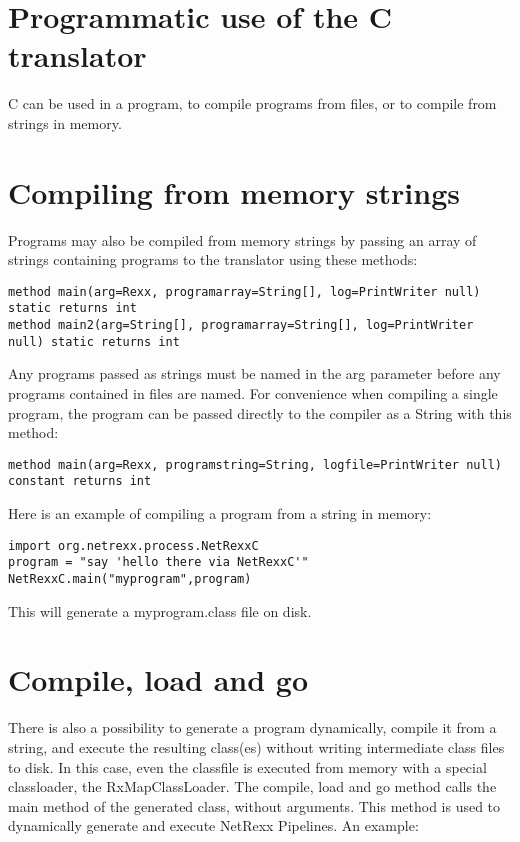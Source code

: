 
\section{Programmatic use of the \nr{}C translator}
\nr{}C can be used in a program, to compile \nr{} programs from files,
or to compile from strings in memory. 

\section{Compiling from memory strings}
Programs may also be compiled from memory strings by passing an array
of strings containing programs to the translator using these methods:

\begin{lstlisting}[label=frommemory,caption=From Memory]
method main(arg=Rexx, programarray=String[], log=PrintWriter null) static returns int
method main2(arg=String[], programarray=String[], log=PrintWriter null) static returns int
\end{lstlisting}

Any programs passed as strings must be named in the arg parameter before any programs contained in files are named.
For convenience when compiling a single program, the program can be
passed directly to the compiler as a String with this method:

\begin{lstlisting}[label=string,caption=With String argument]
method main(arg=Rexx, programstring=String, logfile=PrintWriter null) constant returns int
\end{lstlisting}

Here is an example of compiling a \nr{} program from a string in
memory:

\begin{lstlisting}[label=memexample,caption=Example of compiling from String]
import org.netrexx.process.NetRexxC
program = "say 'hello there via NetRexxC'"
NetRexxC.main("myprogram",program)
\end{lstlisting}
This will generate a myprogram.class file on disk.

\section{Compile, load and go}
There is also a  possibility to generate a program dynamically, compile it from a string, and
execute the resulting class(es) without writing intermediate class
files to disk. In this case, even the classfile is executed from
memory with a special classloader, the RxMapClassLoader. The compile,
load and go method calls the main method of the generated class,
without arguments. This method is used to dynamically generate and
execute NetRexx Pipelines. An example:

